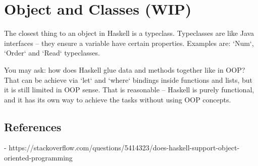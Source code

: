 \documentclass{article}
\begin{document}
\section{Object and Classes (WIP)}

The closest thing to an object in Haskell is a typeclass. Typeclasses are like Java interfaces -- they ensure a variable have certain properties. Examples are: `Num`, `Order` and `Read` typeclasses.

You may ask: how does Haskell glue data and methods together like in OOP? That can be achieve via `let` and `where` bindings inside functions and lists, but it is still limited in OOP sense. That is reasonable -- Haskell is purely functional, and it has its own way to achieve the tasks without using OOP concepts.

\subsection{References}
- https://stackoverflow.com/questions/5414323/does-haskell-support-object-oriented-programming
\end{document}
